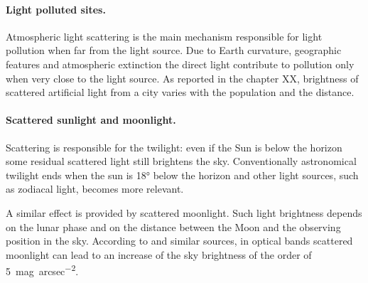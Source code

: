 \paragraph{Light polluted sites.} Atmospheric light scattering is the main mechanism responsible for light pollution when far from the light source. Due to Earth curvature, geographic features and atmospheric extinction the direct light contribute to pollution only when very close to the light source. As reported in the chapter XX, brightness of scattered artificial light from a city varies with the population and the distance.

\paragraph{Scattered sunlight and moonlight.} Scattering is responsible for the twilight: even if the Sun is below the horizon some residual scattered light still brightens the sky. Conventionally astronomical twilight ends when the sun is \ang{18} below the horizon and other light sources, such as zodiacal light, becomes more relevant.

A similar effect is provided by scattered moonlight. Such light brightness depends on the lunar phase and on the distance between the Moon and the observing position in the sky. According to \cite{krisciunas1991model} and similar sources, in optical bands scattered moonlight can lead to an increase of the sky brightness of the order of \SI{5}{mag\per {arcsec}\squared}.